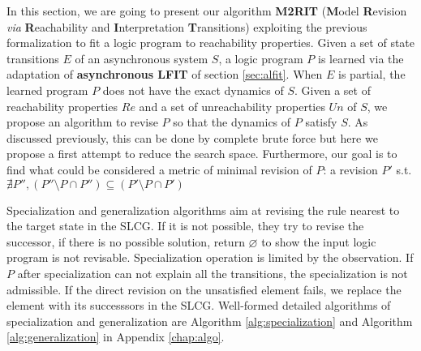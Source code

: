     In this section, we are going to present our algorithm \textbf{M2RIT} (\textbf{M}odel \textbf{R}evision \textit{via} \textbf{R}eachability and \textbf{I}nterpretation \textbf{T}ransitions) exploiting the previous formalization to fit a logic program to reachability properties.
    Given a set of state transitions $E$ of an asynchronous system $S$, a logic program $P$ is learned via the adaptation of \textbf{asynchronous LFIT} of section \ref{sec:alfit}.
    When $E$ is partial, the learned program $P$ does not have the exact dynamics of $S$.
    Given a set of reachability properties $Re$ and a set of unreachability properties $Un$ of $S$, we propose an algorithm to revise $P$ so that the dynamics of $P$ satisfy $S$.
    As discussed previously, this can be done by complete brute force but here we propose a first attempt to reduce the search space.
    Furthermore, our goal is to find what could be considered a metric of minimal revision of $P$:
    a revision $P'$ s.t. $\nexists P'', (P''\setminus P \cap P'')\subseteq (P' \setminus P \cap P')$
   
    Specialization and generalization algorithms aim at revising the rule nearest to the target state in the SLCG. 
    If it is not possible, they try to revise the successor, if there is no possible solution, return $\varnothing$ to show the input logic program is not revisable.
    Specialization operation is limited by the observation. If $P$ after specialization can not explain all the transitions, the specialization is not admissible.
    If the direct revision on the unsatisfied element fails, we replace the element with its successsors in the SLCG.
    Well-formed detailed algorithms of specialization and generalization are Algorithm \ref{alg:specialization} and Algorithm \ref{alg:generalization} in Appendix \ref{chap:algo}.
   
